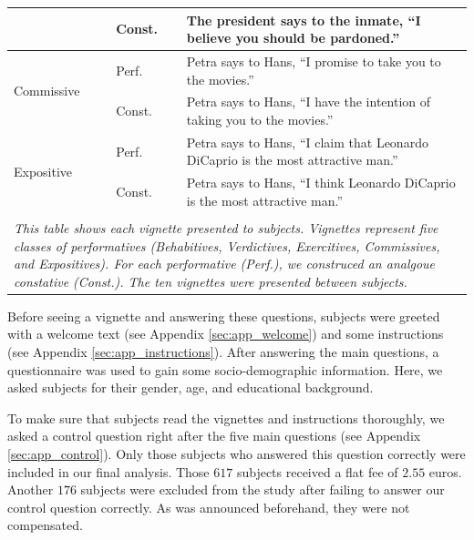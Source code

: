 \documentclass[egregdoesnotlikesansseriftitles,12pt]{scrartcl}
\begin{document}
\begin{table}[ht]
{\begin{tabular}{lll}
                            & Const. & The president says to the inmate, ``I believe you should be pardoned.''                                                                                                                                                   \\
\hline
\multirow{2}{*}{Commissive} & Perf.  & Petra says to Hans, ``I promise to take you to the movies.''                                                                                                                                                              \\
                            & Const. & Petra says to Hans, ``I have the intention of taking you to the movies.''                                                                                                                                                 \\
\hline
\multirow{2}{*}{Expositive} & Perf.  & Petra says to Hans, ``I claim that Leonardo DiCaprio is the most attractive man.''                                                                                                                                        \\
                            & Const. & Petra says to Hans, ``I think Leonardo DiCaprio is the most attractive man.''                                                                                                                                             \\
\hline\\[-1.5ex]
\multicolumn{3}{p{20cm}}{\footnotesize\textit{This table shows each vignette presented to subjects. Vignettes represent five classes of performatives (Behabitives, Verdictives, Exercitives, Commissives, and Expositives). For each performative (Perf.), we construced an analgoue constative (Const.). The ten vignettes were presented between subjects.}}
\caption{Vignettes}\label{tab:vignettes}
\end{tabular}}
\end{table}

Before seeing a vignette and answering these questions, subjects were greeted with a welcome text (see Appendix \ref{sec:app_welcome}) and some instructions (see Appendix \ref{sec:app_instructions}). After answering the main questions, a questionnaire was used to gain some socio-demographic information. Here, we asked subjects for their gender, age, and educational background.

To make sure that subjects read the vignettes and instructions thoroughly, we asked a control question right after the five main questions (see Appendix \ref{sec:app_control}). Only those subjects who answered this question correctly were included in our final analysis. Those $617$ subjects received a flat fee of $2.55$ euros. Another $176$ subjects were excluded from the study after failing to answer our control question correctly. As was announced beforehand, they were not compensated.
\end{document}
